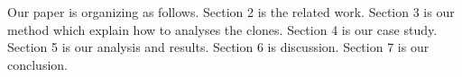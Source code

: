 Our paper is organizing as follows. Section 2 is the related work. %
Section 3 is our method which explain how to analyses the clones. %
Section 4 is our case study. %
Section 5 is our analysis and results. %
Section 6 is discussion. Section 7 is our conclusion. 





